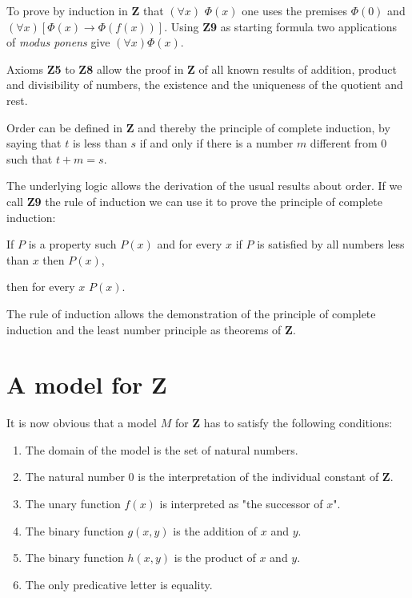\documentclass[12pt]{article}
\begin{document}
To prove by induction in $\textbf{Z}$ that $(\forall x)$ $\Phi (x)$ one uses the premises $\Phi (0)$ and $(\forall x) [ \Phi (x) \rightarrow \Phi ( f (x) ) ]$. Using \textbf{Z9} as starting formula two applications of \emph{modus ponens} give $(\forall x) \Phi (x)$. 

Axioms \textbf{Z5} to \textbf{Z8} allow the proof in $\textbf{Z}$ of all known results of addition, product and divisibility of numbers, the existence and the uniqueness of the quotient and rest.

Order can be defined in $\textbf{Z}$ and thereby the principle of complete induction, by saying that $t$ is less than $s$ if and only if there is a number $m$ different from 0 such that $t + m = s$.

The underlying logic allows the derivation of the usual results about order. If we call \textbf{Z9} the rule of induction we can use it to prove the principle of complete induction:

\begin{center}
If $P$ is a property such $P(x)$ and for every $x$ if $P$ is satisfied by all numbers less than $x$ then $P (x)$, 

then for every $x$ $P (x)$.
\end{center}

The rule of induction allows the demonstration of the principle of complete induction and the least number principle as theorems of $\textbf{Z}$.

\section{A model for \textbf{Z}}\normalsize

It is now obvious that a model $M$ for $\textbf{Z}$ has to satisfy the following conditions:

\begin{enumerate}
\item The domain of the model is the set of natural numbers.
\item The natural number 0 is the interpretation of the individual constant of $\textbf{Z}$.
\item The unary function $f (x)$ is interpreted as "the successor of $x$".
\item The binary function $g (x, y)$ is the addition of $x$ and $y$.
\item The binary function $h (x, y)$ is the product of $x$ and $y$.
\item The only predicative letter is equality.
\end{enumerate}
\end{document}
